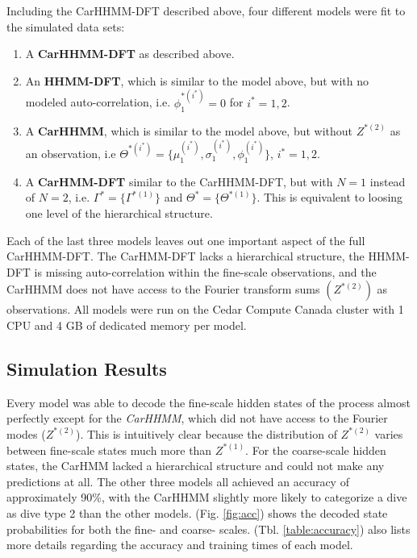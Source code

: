 Including the CarHHMM-DFT described above, four different models were fit to the simulated data sets:
\begin{enumerate}
    \item A \textbf{CarHHMM-DFT} as described above.
    \item An \textbf{HHMM-DFT}, which is similar to the model above, but with no modeled auto-correlation, i.e. $\phi_1^{*(i^*)} = 0$ for $i^* = 1,2$.
    \item A \textbf{CarHHMM}, which is similar to the model above, but without $Z^{*(2)}$ as an observation, i.e $\Theta^{*(i^*)} = \{\mu_1^{(i^*)},\sigma_1^{(i^*)},\phi_1^{(i^*)}\}$, $i^* = 1,2$.
    \item A \textbf{CarHMM-DFT} similar to the CarHHMM-DFT, but with $N=1$ instead of $N=2$, i.e. $\Gamma^* = \{\Gamma^{*(1)}\}$ and $\Theta^* = \{\Theta^{*(1)}\}$. This is equivalent to loosing one level of the hierarchical structure.
\end{enumerate}
%
Each of the last three models leaves out one important aspect of the full CarHHMM-DFT. The CarHMM-DFT lacks a hierarchical structure, the HHMM-DFT is missing auto-correlation within the fine-scale observations, and the CarHHMM does not have access to the Fourier transform sums $(Z^{*(2)})$ as observations. All models were run on the Cedar Compute Canada cluster with 1 CPU and 4 GB of dedicated memory per model.

\subsection{Simulation Results}

Every model was able to decode the fine-scale hidden states of the process almost perfectly except for the \textit{CarHHMM}, which did not have access to the Fourier modes ($Z^{*(2)}$). This is intuitively clear because the distribution of $Z^{*(2)}$ varies between fine-scale states much more than $Z^{*(1)}$. For the coarse-scale hidden states, the CarHMM lacked a hierarchical structure and could not make any predictions at all. The other three models all achieved an accuracy of approximately 90\%, with the CarHHMM slightly more likely to categorize a dive as dive type 2 than the other models. (Fig. \ref{fig:acc}) shows the decoded state probabilities for both the fine- and coarse- scales. (Tbl. \ref{table:accuracy}) also lists more details regarding the accuracy and training times of each model.

